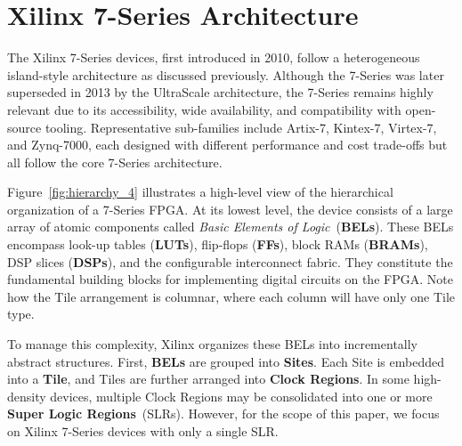 \section{Xilinx 7-Series Architecture}
\label{sec:7_series}
The Xilinx 7-Series devices, first introduced in 2010, follow a heterogeneous island-style architecture as discussed previously. 
Although the 7-Series was later superseded in 2013 by the UltraScale architecture, the 7-Series remains highly relevant due to its accessibility, wide availability, and compatibility with open-source tooling. 
Representative sub-families include Artix-7, Kintex-7, Virtex-7, and Zynq-7000, each designed with different performance and cost trade-offs but all follow the core 7-Series architecture.


Figure~\ref{fig:hierarchy_4} illustrates a high-level view of the hierarchical organization of a 7-Series FPGA. 
At its lowest level, the device consists of a large array of atomic components called \emph{Basic Elements of Logic}~(\textbf{BELs}). 
These BELs encompass look-up tables (\textbf{LUTs}), flip-flops (\textbf{FFs}), block RAMs (\textbf{BRAMs}), DSP slices (\textbf{DSPs}), and the configurable interconnect fabric. 
They constitute the fundamental building blocks for implementing digital circuits on the FPGA.
Note how the Tile arrangement is columnar, where each column will have only one Tile type. 

To manage this complexity, Xilinx organizes these BELs into incrementally abstract structures. 
First, \textbf{BELs} are grouped into \textbf{Sites}. 
Each Site is embedded into a \textbf{Tile}, and Tiles are further arranged into \textbf{Clock Regions}. 
In some high-density devices, multiple Clock Regions may be consolidated into one or more \textbf{Super Logic Regions}~(SLRs). 
However, for the scope of this paper, we focus on Xilinx 7-Series devices with only a single SLR.

